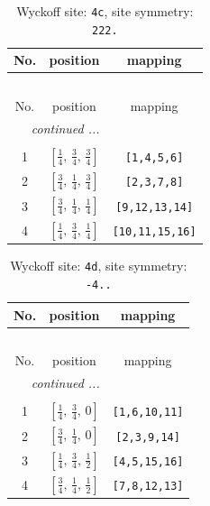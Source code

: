 \documentclass[fleqn,8pt]{jsarticle}
\begin{document}
\renewcommand{\arraystretch}{1.2}
\begin{longtable}{ccc}
\caption{Wyckoff site: {\tt 4c}, site symmetry: {\tt 222.}}
 \\
 \hline \hline
No. & position & mapping \\ \hline \endfirsthead

\multicolumn{2}{l}{\tablename\ \thetable{}} \\
 \hline \hline
No. & position & mapping \\ \hline \endhead

 \hline \hline
\multicolumn{2}{r}{\footnotesize\it continued ...} \\ \endfoot

 \hline \hline
\multicolumn{2}{r}{} \\ \endlastfoot

1 & $\left[ \frac{1}{4},\, \frac{3}{4},\, \frac{3}{4} \right]$ & {\tt [1,4,5,6]} \\ \hline
2 & $\left[ \frac{3}{4},\, \frac{1}{4},\, \frac{3}{4} \right]$ & {\tt [2,3,7,8]} \\ \hline
3 & $\left[ \frac{3}{4},\, \frac{1}{4},\, \frac{1}{4} \right]$ & {\tt [9,12,13,14]} \\ \hline
4 & $\left[ \frac{1}{4},\, \frac{3}{4},\, \frac{1}{4} \right]$ & {\tt [10,11,15,16]} \\
\end{longtable}
\renewcommand{\arraystretch}{1.2}
\begin{longtable}{ccc}
\caption{Wyckoff site: {\tt 4d}, site symmetry: {\tt -4..}}
 \\
 \hline \hline
No. & position & mapping \\ \hline \endfirsthead

\multicolumn{2}{l}{\tablename\ \thetable{}} \\
 \hline \hline
No. & position & mapping \\ \hline \endhead

 \hline \hline
\multicolumn{2}{r}{\footnotesize\it continued ...} \\ \endfoot

 \hline \hline
\multicolumn{2}{r}{} \\ \endlastfoot

1 & $\left[ \frac{1}{4},\, \frac{3}{4},\, 0 \right]$ & {\tt [1,6,10,11]} \\ \hline
2 & $\left[ \frac{3}{4},\, \frac{1}{4},\, 0 \right]$ & {\tt [2,3,9,14]} \\ \hline
3 & $\left[ \frac{1}{4},\, \frac{3}{4},\, \frac{1}{2} \right]$ & {\tt [4,5,15,16]} \\ \hline
4 & $\left[ \frac{3}{4},\, \frac{1}{4},\, \frac{1}{2} \right]$ & {\tt [7,8,12,13]} \\
\end{longtable}
\end{document}
